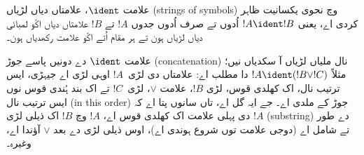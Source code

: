 \documentclass[../../../include/open-logic-section]{subfiles}
\begin{document}
\begin{defn}
علامت $\ident$، علامتاں دیاں لڑیاں (strings of symbols) وچ نحوی
یکسانیت ظاہر کردی اے، یعنی
$!A \ident !B$ اُدوں تے صرف اُدوں جدوں $!A$ تے $!B$ علامتاں دیاں
اکّو لمبائی دیاں لڑیاں ہون تے ہر مقام اُتے اکّو علامت رکھدیاں ہون۔
\end{defn}

علامت $\ident$ دے دونیں پاسے جوڑ (concatenation) نال ملیاں لڑیاں آ
سکدیاں نیں؛ مثلاً
$!A \ident (!B \lor !C)$ دا مطلب اے: علامتاں دی لڑی~$!A$ اوہی لڑی
اے جیہڑی، ایس ترتیب نال، اک کھلدی قوس، لڑی $!B$، علامت $\lor$،
لڑی~$!C$ تے اک بند ہُندی قوس نوں ایس ترتیب نال (in this order) جوڑ کے
ملدی اے۔ جے ایہ گل اے، تاں
سانوں پتا اے کہ $!A$ دی پہلی علامت اک کھلدی قوس اے، $!A$ وچ $!B$ اک
ذیلی لڑی (substring) دے طور تے شامل اے (دوجی علامت توں شروع ہوندی اے)،
اوس ذیلی
لڑی دے بعد $\lor$ آؤندا اے، وغیرہ۔
\end{document}
